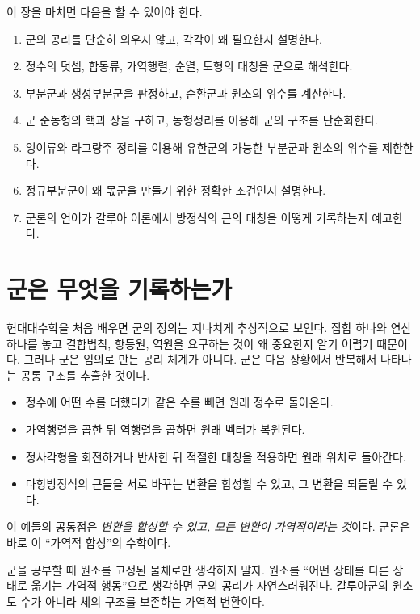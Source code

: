 \begin{learninggoal}
이 장을 마치면 다음을 할 수 있어야 한다.
\begin{enumerate}[label=\arabic*.]
  \item 군의 공리를 단순히 외우지 않고, 각각이 왜 필요한지 설명한다.
  \item 정수의 덧셈, 합동류, 가역행렬, 순열, 도형의 대칭을 군으로 해석한다.
  \item 부분군과 생성부분군을 판정하고, 순환군과 원소의 위수를 계산한다.
  \item 군 준동형의 핵과 상을 구하고, 동형정리를 이용해 군의 구조를 단순화한다.
  \item 잉여류와 라그랑주 정리를 이용해 유한군의 가능한 부분군과 원소의 위수를 제한한다.
  \item 정규부분군이 왜 몫군을 만들기 위한 정확한 조건인지 설명한다.
  \item 군론의 언어가 갈루아 이론에서 방정식의 근의 대칭을 어떻게 기록하는지 예고한다.
\end{enumerate}
\end{learninggoal}

\section{군은 무엇을 기록하는가}

현대대수학을 처음 배우면 군의 정의는 지나치게 추상적으로 보인다. 집합 하나와 연산 하나를 놓고 결합법칙, 항등원, 역원을 요구하는 것이 왜 중요한지 알기 어렵기 때문이다. 그러나 군은 임의로 만든 공리 체계가 아니다. 군은 다음 상황에서 반복해서 나타나는 공통 구조를 추출한 것이다.

\begin{itemize}
  \item 정수에 어떤 수를 더했다가 같은 수를 빼면 원래 정수로 돌아온다.
  \item 가역행렬을 곱한 뒤 역행렬을 곱하면 원래 벡터가 복원된다.
  \item 정사각형을 회전하거나 반사한 뒤 적절한 대칭을 적용하면 원래 위치로 돌아간다.
  \item 다항방정식의 근들을 서로 바꾸는 변환을 합성할 수 있고, 그 변환을 되돌릴 수 있다.
\end{itemize}

이 예들의 공통점은 \emph{변환을 합성할 수 있고, 모든 변환이 가역적이라는 것}이다. 군론은 바로 이 ``가역적 합성''의 수학이다.

\begin{keyidea}
군을 공부할 때 원소를 고정된 물체로만 생각하지 말자. 원소를 ``어떤 상태를 다른 상태로 옮기는 가역적 행동''으로 생각하면 군의 공리가 자연스러워진다. 갈루아군의 원소도 수가 아니라 체의 구조를 보존하는 가역적 변환이다.
\end{keyidea}

